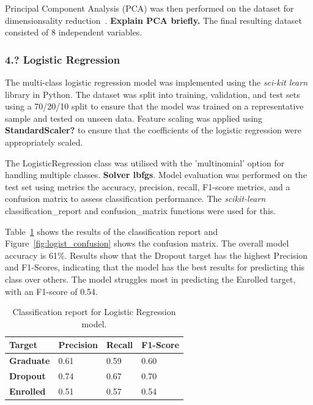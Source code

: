 \documentclass[11pt]{article}
\begin{document}
Principal Component Analysis (PCA) was then performed on the dataset for dimensionsality reduction~\cite{gewers_etal}. \textbf{Explain PCA briefly.} The final resulting dataset consisted of 8 independent variables.

\newpage
\subsubsection*{4.? Logistic Regression}

The multi-class logistic regression model was implemented using the \textit{sci-kit learn} library in Python. The dataset was split into training, validation, and test sets using a 70/20/10 split to ensure that the model was trained on a representative sample and tested on unseen data. Feature scaling was applied using \textbf{StandardScaler?} to ensure that the coefficients of the logistic regression were appropriately scaled.

The LogisticRegression class was utilised with the 'multinomial' option for handling multiple classes. \textbf{Solver lbfgs}. Model evaluation was performed on the test set using metrics the accuracy, precision, recall, F1-score metrics, and a confusion matrix to assess classification performance. The \textit{scikit-learn} classification\_report and confusion\_matrix functions were used for this. 

Table~\ref{tab:logist_results} shows the results of the classification report and Figure~\ref{fig:logist_confusion} shows the confusion matrix. The overall model accuracy is 61\%. Results show that the Dropout target has the highest Precision and F1-Scores, indicating that the model has the best results for predicting this class over others. The model struggles most in predicting the Enrolled target, with an F1-score of 0.54.
 
\begin{table}[h!]
  \centering
  \begin{tabular}{ | m{2.5cm} || m{2cm} | m{2cm} | m{2cm} | } 
    \hline
    \textbf{Target} & \textbf{Precision} & \textbf{Recall} & \textbf{F1-Score} \\ 
    \hline
    \hline
    \textbf{Graduate} & 0.61 & 0.59 & 0.60 \\ 
    \hline
    \textbf{Dropout} & 0.74 & 0.67 & 0.70 \\ 
    \hline
    \textbf{Enrolled} & 0.51 & 0.57 & 0.54 \\
    \hline
  \end{tabular}
  \caption{Classification report for Logistic Regression model.}
  \label{tab:logist_results}
\end{table}
\end{document}
